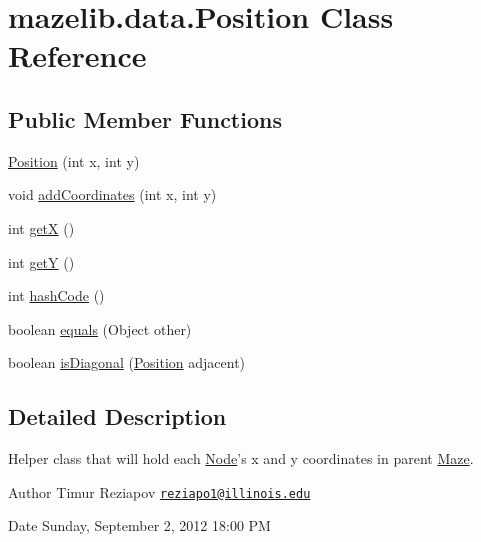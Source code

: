 \hypertarget{classmazelib_1_1data_1_1_position}{\section{mazelib.\-data.\-Position Class Reference}
\label{classmazelib_1_1data_1_1_position}
}
\subsection*{Public Member Functions}
\begin{DoxyCompactItemize}
\item 
\hyperlink{classmazelib_1_1data_1_1_position_a4a68ad54bacb89324df2891d342822b3}{Position} (int x, int y)
\item 
void \hyperlink{classmazelib_1_1data_1_1_position_a36e7b44fb51095864dcf4f269afb20d7}{add\-Coordinates} (int x, int y)
\item 
int \hyperlink{classmazelib_1_1data_1_1_position_a590d7e0c43088379914764005947d721}{get\-X} ()
\item 
int \hyperlink{classmazelib_1_1data_1_1_position_a8c9c9a427f0d8b0e9f9ef87ff591048b}{get\-Y} ()
\item 
int \hyperlink{classmazelib_1_1data_1_1_position_a99573983ef4b609c8b70374d143d9f47}{hash\-Code} ()
\item 
boolean \hyperlink{classmazelib_1_1data_1_1_position_a8903a19cec1cadb6099f9cd6d9a145d0}{equals} (Object other)
\item 
boolean \hyperlink{classmazelib_1_1data_1_1_position_a948853bc43f341fc1ed91b7c5809dd21}{is\-Diagonal} (\hyperlink{classmazelib_1_1data_1_1_position}{Position} adjacent)
\end{DoxyCompactItemize}


\subsection{Detailed Description}
Helper class that will hold each \hyperlink{classmazelib_1_1data_1_1_node}{Node}'s x and y coordinates in parent \hyperlink{classmazelib_1_1data_1_1_maze}{Maze}. \begin{DoxyAuthor}{Author}
Timur Reziapov \href{mailto:reziapo1@illinois.edu}{\tt reziapo1@illinois.\-edu} 
\end{DoxyAuthor}
\begin{DoxyDate}{Date}
Sunday, September 2, 2012 18\-:00 P\-M 
\end{DoxyDate}


